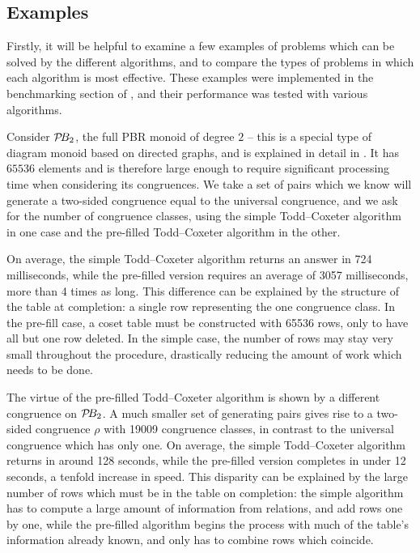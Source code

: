 \subsection{Examples}
Firstly, it will be helpful to examine a few examples of problems which can be
solved by the different algorithms, and to compare the types of problems in
which each algorithm is most effective.  These examples were implemented in the
benchmarking section of \libsemigroups{}, and their performance was tested
with various algorithms.

\begin{example}
  \label{ex:good-tc}
  Consider $\mathcal{P}\!B_2$, the full PBR monoid of degree $2$ -- this is a special type
  of diagram monoid based on directed graphs, and is explained in detail in
  \cite[\S2.1]{diagram_semigroups}.  It has $65536$ elements and is therefore
  large enough to require significant processing time when considering its
  congruences.  We take a set of pairs which we know will generate a two-sided
  congruence equal to the universal congruence, and we ask \libsemigroups{} for
  the number of congruence classes, using the simple Todd--Coxeter algorithm in one case and
  the pre-filled Todd--Coxeter algorithm in the other.

  On average, the simple Todd--Coxeter algorithm returns an answer in 724 milliseconds, while
  the pre-filled version requires an average of 3057 milliseconds, more than 4
  times as long.  This difference can be explained by the structure
  of the table at completion: a single row representing the one congruence
  class.  In the pre-fill case, a coset table must be constructed with 65536
  rows, only to have all but one row deleted.  In the simple case,
  the number of rows may stay very small throughout the procedure, drastically
  reducing the amount of work which needs to be done.
\end{example}

\begin{example}
  \label{ex:good-tc-prefill}
  The virtue of the pre-filled Todd--Coxeter algorithm is shown by a different congruence on
  $\mathcal{P}\!B_2$.  A much smaller set of generating pairs gives rise to a two-sided congruence
  $\rho$ with 19009 congruence classes, in contrast to the universal congruence
  which has only one.  On average, the simple Todd--Coxeter algorithm returns in around 128
  seconds, while the pre-filled version completes in under 12 seconds, a tenfold
  increase in speed.  This disparity can be explained by the large number of
  rows which must be in the table on completion: the simple algorithm has to
  compute a large amount of information from relations, and add rows one by one,
  while the pre-filled algorithm begins the process with much of the table's
  information already known, and only has to combine rows which coincide.
\end{example}

